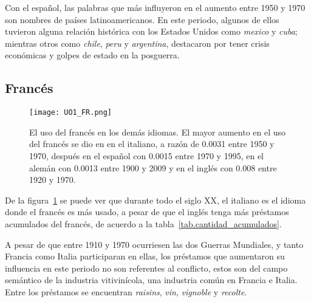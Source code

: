 Con el español, las palabras que más influyeron en el aumento entre 1950 y 1970 son nombres de países latinoamericanos. En este periodo, algunos de ellos tuvieron alguna relación histórica con los Estados Unidos como \textit{mexico} y \textit{cuba}; mientras otros como \textit{chile}, \textit{peru} y \textit{argentina}, destacaron por tener crisis económicas y golpes de estado en la posguerra.  
\label{D-EN}


 



\subsection{Francés} %

\begin{figure}[h!]
	\centering
	\texttt{[image: UO1\_FR.png]}
	\caption{El uso del francés en los demás idiomas. El mayor aumento en el uso del francés se dio en en el italiano, a razón de 0.0031 entre 1950 y 1970, después en el español con 0.0015 entre 1970 y 1995, en el alemán con 0.0013 entre 1900 y 2009	 y en el inglés con 0.008 entre 1920 y 1970.}
	\label{fig.UO_FR}
\end{figure}

De la figura~\ref{fig.UO_FR} se puede ver que durante todo el siglo XX, el italiano es el idioma donde el francés es más usado, a pesar de que el inglés tenga más préstamos acumulados del francés, de acuerdo a la tabla~\ref{tab.cantidad_acumulados}. 


A pesar de que entre 1910 y 1970 ocurriesen las dos Guerras Mundiales, y tanto Francia como Italia participaran en ellas,  los préstamos que aumentaron su influencia en este periodo no son referentes al conflicto, estos son del campo semántico de la industria vitivinícola, una industria común en Francia e Italia. Entre los préstamos se encuentran \textit{raisins}, \textit{vin}, \textit{vignoble} y \textit{recolte}. 

